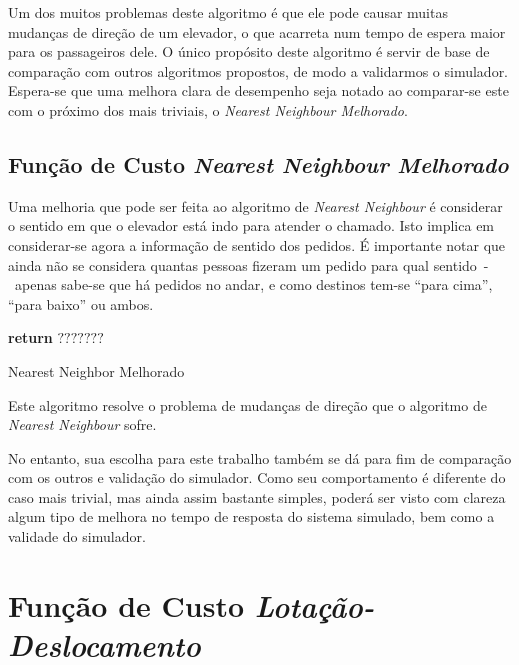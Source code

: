 Um dos muitos problemas deste algoritmo é que ele pode causar muitas mudanças de
direção de um elevador, o que acarreta num tempo de espera maior para os
passageiros dele. O único propósito deste algoritmo é servir de base de
comparação com outros algoritmos propostos, de modo a validarmos o simulador.
Espera-se que uma melhora clara de desempenho seja notado ao comparar-se este
com o próximo dos mais triviais, o \textit{Nearest Neighbour Melhorado}.


\subsection{\label{sec:ai:nnm}Função de Custo \textit{Nearest Neighbour
Melhorado}}

Uma melhoria que pode ser feita ao algoritmo de \textit{Nearest Neighbour}
é considerar o sentido em que o elevador está indo para atender o chamado. Isto
implica em considerar-se agora a informação de sentido dos pedidos. É importante
notar que ainda não se considera quantas pessoas fizeram um pedido para qual
sentido~-~apenas sabe-se que há pedidos no andar, e como destinos tem-se ``para
cima'', ``para baixo'' ou ambos.

\begin{algorithm}[htb]
\begin{center}
\begin{algorithmic}[1]
  \State \textbf{return} $???????$
\EndFunction
\end{algorithmic}
\end{center}
\caption
   {\label{alg:nnm}Nearest Neighbor Melhorado}
\end{algorithm}

Este algoritmo resolve o problema de mudanças de direção que o algoritmo de
\textit{Nearest Neighbour} sofre.

No entanto, sua escolha para este trabalho também se dá para fim de comparação
com os outros e validação do simulador. Como seu comportamento é diferente do
caso mais trivial, mas ainda assim bastante simples, poderá ser visto com clareza
algum tipo de melhora no tempo de resposta do sistema simulado, bem como a validade do simulador.

\section{\label{sec:ai:lotacao}Função de Custo \textit{Lotação-Deslocamento}}

